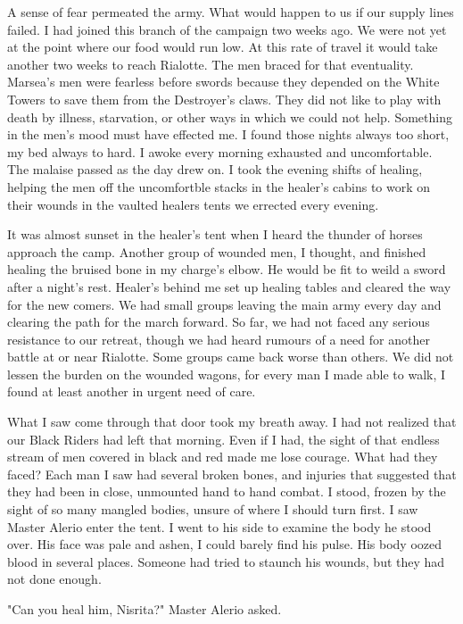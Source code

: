 \documentclass{article}
\begin{document}
A sense of fear permeated the army. What would happen to us if our supply lines failed. I had joined this branch of the campaign two weeks ago. We were not yet at the point where our food would run low. At this rate of travel it would take another two weeks to reach Rialotte. The men braced for that eventuality. Marsea's men were fearless before swords because they depended on the White Towers to save them from the Destroyer's claws. They did not like to play with death by illness, starvation, or other ways in which we could not help. Something in the men's mood must have effected me. I found those nights always too short, my bed always to hard. I awoke every morning exhausted and uncomfortable. The malaise passed as the day drew on. I took the evening shifts of healing, helping the men off the uncomfortble stacks in the healer's cabins to work on their wounds in the vaulted healers tents we errected every evening. 

It was almost sunset in the healer's tent when I heard the thunder of horses approach the camp. Another group of wounded men, I thought, and finished healing the bruised bone in my charge's elbow. He would be fit to weild a sword after a night's rest. Healer's behind me set up healing tables and cleared the way for the new comers. We had small groups leaving the main army every day and clearing the path for the march forward. So far, we had not faced any serious resistance to our retreat, though we had heard rumours of a need for another battle at or near Rialotte. Some groups came back worse than others. We did not lessen the burden on the wounded wagons, for every man I made able to walk, I found at least another in urgent need of care.

What I saw come through that door took my breath away. I had not realized that our Black Riders had left that morning. Even if I had, the sight of that endless stream of men covered in black and red made me lose courage. What had they faced? Each man I saw had several broken bones, and injuries that suggested that they had been in close, unmounted hand to hand combat. I stood, frozen by the sight of so many mangled bodies, unsure of where I should turn first. I saw Master Alerio enter the tent. I went to his side to examine the body he stood over. His face was pale and ashen, I could barely find his pulse. His body oozed blood in several places. Someone had tried to staunch his wounds, but they had not done enough. 

"Can you heal him, Nisrita?" Master Alerio asked.
\end{document}
